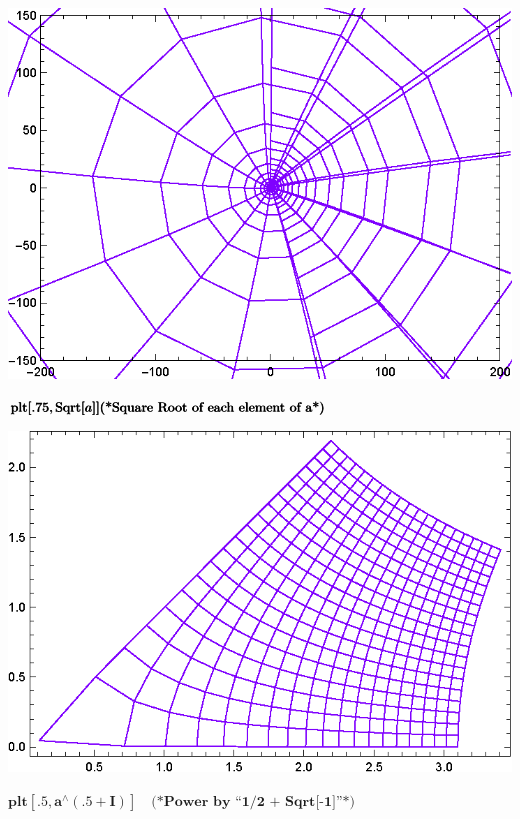 \documentclass{article}
\begin{document}
\includegraphics{functions_on_complex-plane_gr10.eps}

\begin{doublespace}
\noindent\(\pmb{\text{plt}[.75,\text{Sqrt}[a]]}\\
\pmb{\text{(*Square Root of each element of a*)}}\)
\end{doublespace}

\includegraphics{functions_on_complex-plane_gr11.eps}

\begin{doublespace}
\noindent\(\pmb{\text{plt}[.5,a{}^{\wedge}(.5+I)]\quad \text{(*Power by {``}1/2 + Sqrt[-1]{''}*)}}\)
\end{doublespace}
\end{document}
